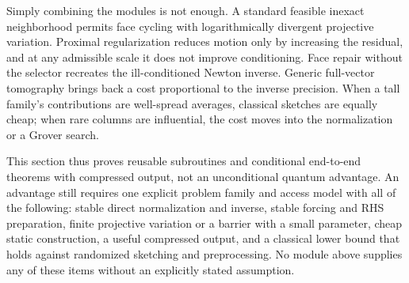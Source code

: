 Simply combining the modules is not enough.  A standard feasible inexact neighborhood permits face
cycling with logarithmically divergent projective variation.  Proximal
regularization reduces motion only by increasing the residual, and at any
admissible scale it does not improve conditioning.  Face repair without the
selector recreates the ill-conditioned Newton inverse.  Generic full-vector
tomography brings back a cost proportional to the inverse precision.  When a
tall family's contributions are well-spread averages, classical sketches are
equally cheap; when rare columns are influential, the cost moves into the
normalization or a Grover search.

This section thus proves reusable subroutines and conditional end-to-end
theorems with compressed output, not an unconditional quantum advantage.  An
advantage still requires one explicit problem family and
access model with all of the following: stable direct
normalization and inverse, stable forcing and RHS preparation, finite
projective variation or a barrier with a small parameter, cheap static
construction, a useful compressed output, and a classical lower bound that
holds against randomized sketching and preprocessing.  No module above
supplies any of these items without an explicitly stated assumption.
